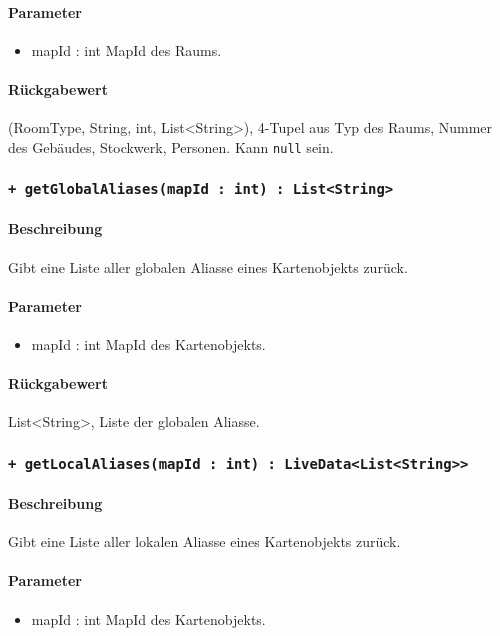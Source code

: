\paragraph*{Parameter}
\begin{itemize}
    \item mapId : int MapId des Raums.
\end{itemize}
\paragraph*{Rückgabewert}
(RoomType, String, int, List<String>), 4-Tupel aus Typ des Raums, Nummer des Gebäudes, Stockwerk, Personen. Kann \texttt{null} sein.

\subsubsection{\texttt{+ getGlobalAliases(mapId : int) : List<String>}}%
\paragraph*{Beschreibung}
Gibt eine Liste aller globalen Aliasse eines Kartenobjekts zurück.
\paragraph*{Parameter}
\begin{itemize}
    \item mapId : int MapId des Kartenobjekts.
\end{itemize}
\paragraph*{Rückgabewert}
List<String>, Liste der globalen Aliasse.

\subsubsection{\texttt{+ getLocalAliases(mapId : int) : LiveData<List<String>>}}%
\paragraph*{Beschreibung}
Gibt eine Liste aller lokalen Aliasse eines Kartenobjekts zurück.
\paragraph*{Parameter}
\begin{itemize}
    \item mapId : int MapId des Kartenobjekts.
\end{itemize}

